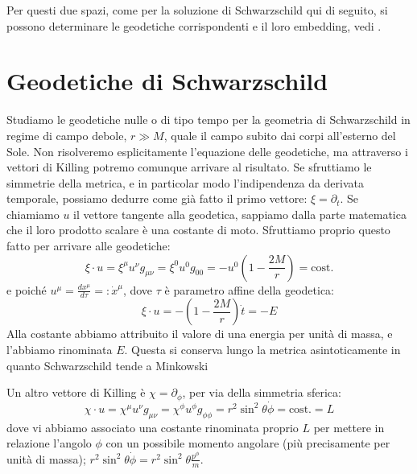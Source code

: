 Per questi due spazi, come per la soluzione di Schwarzschild qui di seguito, si possono determinare le geodetiche corrispondenti e il loro embedding, vedi \cite{tong}.
\section{Geodetiche di Schwarzschild}\label{para.geodschwarz}
Studiamo le geodetiche nulle o di tipo tempo per la geometria di Schwarzschild in regime di campo debole, $r\gg M$, quale il campo subito dai corpi  all'esterno del Sole.
Non risolveremo esplicitamente l'equazione delle geodetiche, ma attraverso i vettori di Killing potremo comunque arrivare al risultato.
Se sfruttiamo le simmetrie della metrica, e in particolar modo l'indipendenza da derivata temporale, possiamo dedurre come già fatto il primo vettore:
$\xi = \partial_t$. Se chiamiamo $u$ il vettore tangente alla geodetica, sappiamo dalla parte matematica che il loro prodotto scalare è una costante di moto. Sfruttiamo proprio questo fatto per arrivare alle geodetiche:
\begin{equation*}
    \xi \cdot u = \xi^\mu u^\nu g_{\mu\nu} = \xi^0 u^0 g_{00}= - u^0\left(1-\frac{2M}{r}\right) = \textrm{cost.}
\end{equation*}
e poiché $u^\mu =\frac{dx^\mu}{d\tau}=:\dot{x}^\mu$, dove $\tau$ è parametro affine della geodetica:
\begin{equation*}
    \xi \cdot u = - \left(1-\frac{2M}{r}\right)\Dot{t} = - E
\end{equation*}
Alla costante abbiamo attribuito il valore di una energia per unità di massa, e l'abbiamo rinominata $E$. Questa si conserva lungo la metrica asintoticamente in quanto Schwarzschild tende a Minkowski


Un altro vettore di Killing è $\chi = \partial_\phi$, per via della simmetria sferica:
\begin{equation*}
    \chi \cdot u = \chi^\mu u^\nu g_{\mu\nu} = \chi^\phi u^\phi g_{\phi\phi} = r^2\sin^2\theta \Dot{\phi} = \textrm{cost.} = L
\end{equation*}
dove vi abbiamo associato una costante rinominata proprio $L$ per mettere in relazione l'angolo $\phi$ con un possibile momento angolare (più precisamente per unità di massa); $r^2\sin^2\theta \Dot{\phi} = r^2 \sin^2\theta \frac{p^\phi}{m}$.

